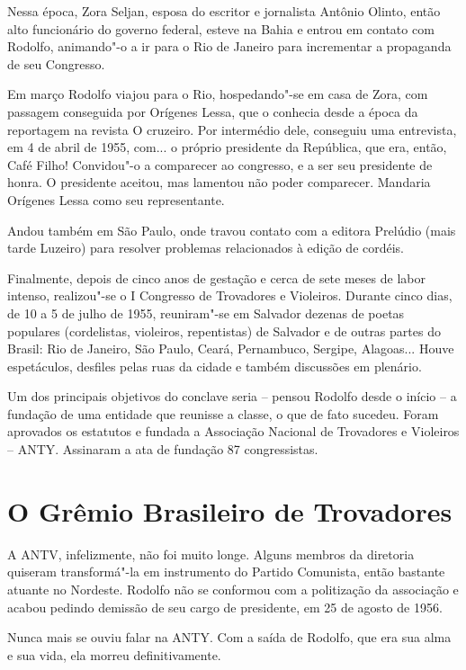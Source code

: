  Nessa época, Zora Seljan, esposa do escritor e jornalista Antônio
Olinto, então alto funcionário do governo federal, esteve na Bahia e
entrou em contato com Rodolfo, animando"-o a ir para o Rio de Janeiro
para incrementar a propaganda de seu Congresso. 

 Em março Rodolfo viajou para o Rio, hospedando"-se em casa de Zora,
com passagem conseguida por Orígenes Lessa, que o conhecia desde a
época da reportagem na revista O cruzeiro. Por intermédio dele,
conseguiu uma entrevista, em 4 de abril de 1955, com... o próprio
presidente da República, que era, então, Café Filho! Convidou"-o a
comparecer ao congresso, e a ser seu presidente de honra. O presidente
aceitou, mas lamentou não poder comparecer. Mandaria Orígenes Lessa
como seu representante. 

 Andou também em São Paulo, onde travou contato com a editora Prelúdio
(mais tarde Luzeiro) para resolver problemas relacionados à edição de
cordéis. 

 Finalmente, depois de cinco anos de gestação e cerca de sete meses de
labor intenso, realizou"-se o I Congresso de Trovadores e Violeiros.
Durante cinco dias, de 10 a 5 de julho de 1955, reuniram"-se em
Salvador dezenas de poetas populares (cordelistas, violeiros,
repentistas) de Salvador e de outras partes do Brasil: Rio de Janeiro,
São Paulo, Ceará, Pernambuco, Sergipe, Alagoas... Houve espetáculos,
desfiles pelas ruas da cidade e também discussões em plenário. 

 Um dos principais objetivos do conclave seria -- pensou Rodolfo
desde o início -- a fundação de uma entidade que reunisse a classe,
o que de fato sucedeu. Foram aprovados os estatutos e fundada a
Associação Nacional de Trovadores e Violeiros -- ANTY. Assinaram a ata
de fundação 87 congressistas. 

\section{O Grêmio Brasileiro de Trovadores}

 A ANTV, infelizmente, não foi muito longe. Alguns membros da diretoria
quiseram transformá"-la em instrumento do Partido Comunista, então
bastante atuante no Nordeste. Rodolfo não se conformou com a
politização da associação e acabou pedindo demissão de seu cargo de
presidente, em 25 de agosto de 1956. 

 Nunca mais se ouviu falar na ANTY. Com a saída de Rodolfo, que era sua
alma e sua vida, ela morreu definitivamente. 

